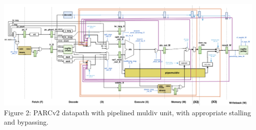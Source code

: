 \documentclass[12pt]{article}
\begin{document}
\vspace{0.3cm}

\begin{center}
\includegraphics[scale=0.28]{../lab2_longdpath.png}
Figure 2: PARCv2 datapath with pipelined muldiv unit, with appropriate stalling and bypassing. 
\end{center}
\end{document}
